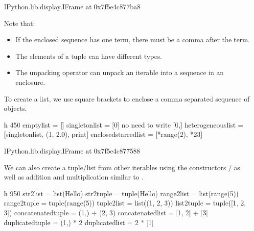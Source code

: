 \documentclass[letterpaper,10pt,english]{sphinxmanual}
\begin{document}
\begin{sphinxVerbatim}[commandchars=\\\{\}]
\PYGZlt{}IPython.lib.display.IFrame at 0x7f5e4c877ba8\PYGZgt{}
\end{sphinxVerbatim}

Note that:
\begin{itemize}
\item {} 
If the enclosed sequence has one term, there must be a comma after the term.

\item {} 
The elements of a tuple can have different types.

\item {} 
The unpacking operator \sphinxcode{\sphinxupquote{*}} can unpack an iterable into a sequence in an enclosure.

\end{itemize}

To create a list, we use square brackets to enclose a comma separated sequence of objects.

\begin{sphinxVerbatim}[commandchars=\\\{\}]
 \PYGZhy{}h 450
empty\PYGZus{}list = []
singleton\PYGZus{}list = [0]  \PYGZsh{} no need to write [0,]
heterogeneous\PYGZus{}list = [singleton\PYGZus{}list, 
                      (1, 2.0), 
                      print]
enclosed\PYGZus{}starred\PYGZus{}list = [*range(2),
                         *\PYGZsq{}23\PYGZsq{}]
\end{sphinxVerbatim}

\begin{sphinxVerbatim}[commandchars=\\\{\}]
\PYGZlt{}IPython.lib.display.IFrame at 0x7f5e4c877588\PYGZgt{}
\end{sphinxVerbatim}

We can also create a tuple/list from other iterables using the constructors / as well as addition and multiplication similar to .

\begin{sphinxVerbatim}[commandchars=\\\{\}]
 \PYGZhy{}h 950
str2list = list(\PYGZsq{}Hello\PYGZsq{})
str2tuple = tuple(\PYGZsq{}Hello\PYGZsq{})
range2list = list(range(5))
range2tuple = tuple(range(5))
tuple2list = list((1, 2, 3))
list2tuple = tuple([1, 2, 3])
concatenated\PYGZus{}tuple = (1,) + (2, 3)
concatenated\PYGZus{}list = [1, 2] + [3]
duplicated\PYGZus{}tuple = (1,) * 2
duplicated\PYGZus{}list = 2 * [1]
\end{sphinxVerbatim}
\end{document}
